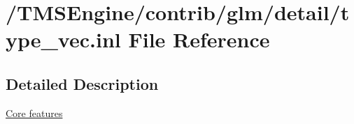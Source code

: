 \hypertarget{type__vec_8inl}{}\section{/\+T\+M\+S\+Engine/contrib/glm/detail/type\+\_\+vec.inl File Reference}
\label{type__vec_8inl}


\subsection{Detailed Description}
\hyperlink{group__core}{Core features} 